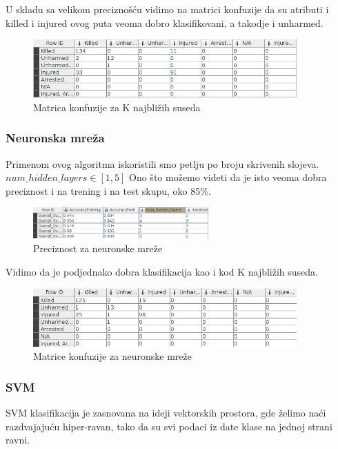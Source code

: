 \documentclass[12pt, a4paper]{article}
\begin{document}
U skladu sa velikom precizno\v s\' cu vidimo na matrici konfuzije da su atributi i killed i injured ovog puta veoma dobro klasifikovani, a takodje i unharmed.

\begin{figure}[H]
\centering
\includegraphics[width=0.9\textwidth]{kNearest_confussionMatrix_childrenKI.png}
\caption{Matrica konfuzije za K najbli\v zih suseda}
\end{figure}

\subsubsection{Neuronska mre\v za}
Primenom ovog algoritma iskoristili smo petlju po broju skrivenih slojeva.\\
$num\_hidden\_layers \in [1,5]$
Ono \v sto mo\v zemo videti da je isto veoma dobra preciznost i na trening i na test skupu, oko 85\%.


\begin{figure}[H]
\centering
\includegraphics[width=0.6\textwidth]{neuronske_accr_childrenKI.png}
\caption{Preciznost za neuronske mre\v ze}
\end{figure}

Vidimo da je podjednako dobra klasifikacija kao i kod K najbli\v zih suseda.

\begin{figure}[H]
\centering
\includegraphics[width=0.9\textwidth]{neuronske_confussionMatrix_childrenKI.png}
\caption{Matrice konfuzije za neuronske mre\v ze}
\end{figure}

\subsubsection{SVM}
SVM klasifikacija je zasnovana na ideji vektorskih prostora, gde \v zelimo na\' ci razdvajaju\' cu hiper-ravan, tako da su svi podaci iz date klase na jednoj strani ravni.\\
\end{document}
